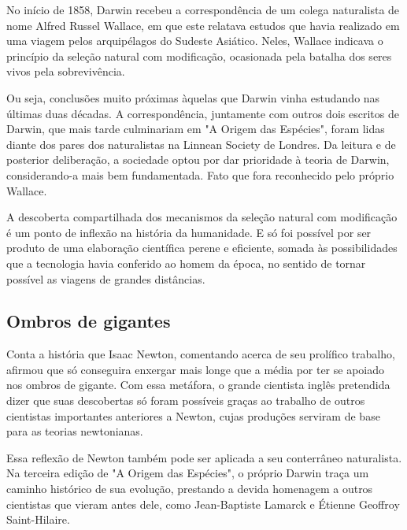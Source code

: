 \documentclass[12pt]{extarticle}
\begin{document}
No início de 1858, Darwin recebeu a correspondência de um colega naturalista de
nome Alfred Russel Wallace, em que este relatava estudos que havia realizado em
uma viagem pelos arquipélagos do Sudeste Asiático. Neles, Wallace indicava
o princípio da seleção natural com modificação, ocasionada pela batalha dos
seres vivos pela sobrevivência.

Ou seja, conclusões muito próximas àquelas que Darwin vinha estudando nas
últimas duas décadas. A correspondência, juntamente com outros dois escritos de
Darwin, que mais tarde culminariam em "A Origem das Espécies", foram lidas
diante dos pares dos naturalistas na Linnean Society de Londres. Da leitura
e de posterior deliberação, a sociedade optou por dar prioridade à teoria de
Darwin, considerando-a mais bem fundamentada. Fato que fora reconhecido pelo
próprio Wallace.




A descoberta compartilhada dos mecanismos da seleção natural com modificação
é um ponto de inflexão na história da humanidade. E só foi possível por ser
produto de uma elaboração científica perene e eficiente, somada às
possibilidades que a tecnologia havia conferido ao homem da época, no sentido
de tornar possível as viagens de grandes distâncias.




\subsection{Ombros de gigantes}

Conta a história que Isaac Newton, comentando acerca de seu prolífico trabalho,
afirmou que só conseguira enxergar mais longe que a média por ter se apoiado
nos ombros de gigante. Com essa metáfora, o grande cientista inglês pretendida
dizer que suas descobertas só foram possíveis graças ao trabalho de outros
cientistas importantes anteriores a Newton, cujas produções serviram de base
para as teorias newtonianas.

Essa reflexão de Newton também pode ser aplicada a seu conterrâneo naturalista.
Na terceira edição de "A Origem das Espécies", o próprio Darwin traça um
caminho histórico de sua evolução, prestando a devida homenagem a outros
cientistas que vieram antes dele, como Jean-Baptiste Lamarck e Étienne Geoffroy
Saint-Hilaire.
\end{document}
